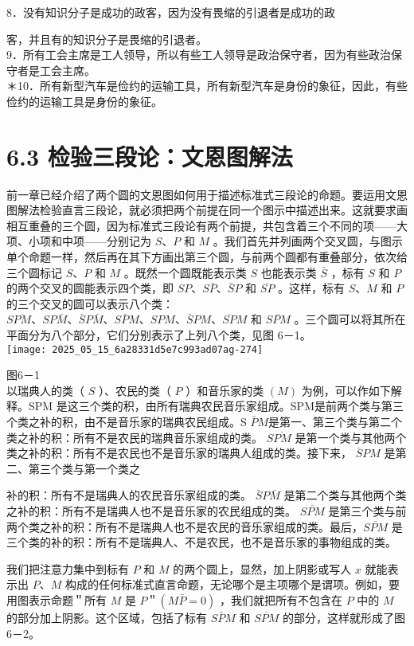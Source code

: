 8．没有知识分子是成功的政客，因为没有畏缩的引退者是成功的政

客，并且有的知识分子是畏缩的引退者。\\
9．所有工会主席是工人领导，所以有些工人领导是政治保守者，因为有些政治保守者是工会主席。\\
＊10．所有新型汽车是俭约的运输工具，所有新型汽车是身份的象征，因此，有些俭约的运输工具是身份的象征。

\section*{6.3 检验三段论：文恩图解法}
前一章已经介绍了两个圆的文恩图如何用于描述标准式三段论的命题。要运用文恩图解法检验直言三段论，就必须把两个前提在同一个图示中描述出来。这就要求画相互重叠的三个圆，因为标准式三段论有两个前提，共包含着三个不同的项——大项、小项和中项——分别记为 $S 、 P$ 和 $M$ 。我们首先并列画两个交叉圆，与图示单个命题一样，然后再在其下方画出第三个圆，与前两个圆都有重叠部分，依次给三个圆标记 $S 、 P$ 和 $M$ 。既然一个圆既能表示类 $S$ 也能表示类 $\bar{S}$ ，标有 $S$ 和 $P$ 的两个交叉的圆能表示四个类，即 $S P 、 S \bar{P} 、 \bar{S} P$ 和 $\overline{S P}$ 。这样，标有 $S 、 M$ 和 $P$ 的三个交叉的圆可以表示八个类：$S \overline{P M} 、 S P \bar{M} 、 \bar{S} P \bar{M} 、 S \bar{P} M 、 S P M 、 \bar{S} P M 、 \overline{S P} M$ 和 $\overline{S P M}$ 。三个圆可以将其所在平面分为八个部分，它们分别表示了上列八个类，见图 6－1。\\
\texttt{[image: 2025\_05\_15\_6a28331d5e7c993ad07ag-274]}

图6－1\\
以瑞典人的类（ $S$ ）、农民的类（ $P$ ）和音乐家的类 $(M)$ 为例，可以作如下解释。SPM 是这三个类的积，由所有瑞典农民音乐家组成。SPM是前两个类与第三个类之补的积，由不是音乐家的瑞典农民组成。S $\bar{P} M$是第一、第三个类与第二个类之补的积：所有不是农民的瑞典音乐家组成的类。 $S \overline{P M}$ 是第一个类与其他两个类之补的积：所有不是农民也不是音乐家的瑞典人组成的类。接下来， $\bar{S} P M$ 是第二、第三个类与第一个类之

补的积：所有不是瑞典人的农民音乐家组成的类。 $\bar{S} P \bar{M}$ 是第二个类与其他两个类之补的积：所有不是瑞典人也不是音乐家的农民组成的类。 $\overline{S P M}$ 是第三个类与前两个类之补的积：所有不是瑞典人也不是农民的音乐家组成的类。最后，$\overline{S P M}$ 是三个类的补的积：所有不是瑞典人、不是农民，也不是音乐家的事物组成的类。

我们把注意力集中到标有 $P$ 和 $M$ 的两个圆上，显然，加上阴影或写人 $x$ 就能表示出 $P 、 M$ 构成的任何标准式直言命题，无论哪个是主项哪个是谓项。例如，要用图表示命题＂所有 $M$ 是 $P$＂$(M \bar{P}=0)$ ，我们就把所有不包含在 $P$ 中的 $M$ 的部分加上阴影。这个区域，包括了标有 $S \bar{P} M$ 和 $\overline{S P M}$ 的部分，这样就形成了图6－2。

